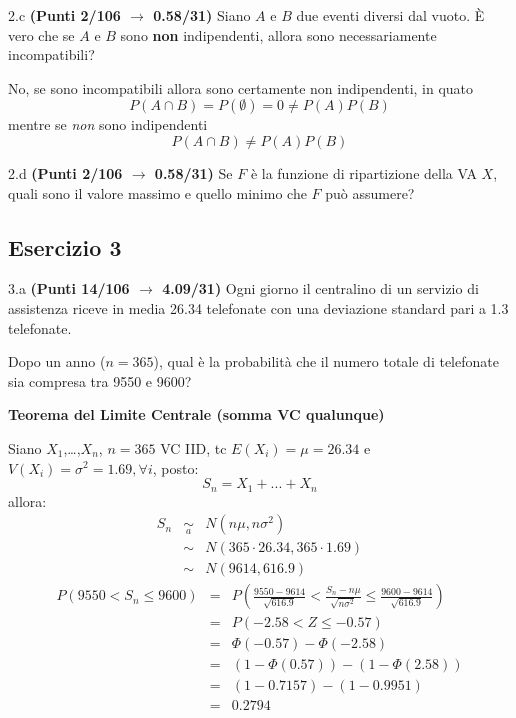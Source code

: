 \documentclass[
  11pt,
]{book}
\theoremstyle{mytheoremstyle}
\theoremstyle{mydefstyle}
\newenvironment{sol}
  {
  \begin{tcolorbox}[enhanced,breakable,arc=0.1mm,boxrule=1pt,colback=white,colframe=iblue,
  title=\bf \fontfamily{lmss}\selectfont \hspace{.5 cm} Soluzione,drop fuzzy shadow]

}{
\end{tcolorbox}
  }
\begin{document}
2.c \textbf{(Punti 2/106 \(\rightarrow\) 0.58/31)} Siano \(A\) e \(B\) due eventi diversi dal vuoto. È vero che se \(A\) e \(B\) sono
\textbf{non} indipendenti, allora sono necessariamente incompatibili?

\begin{sol}
No, se sono incompatibili allora sono certamente non indipendenti, in quato
\[
P(A\cap B)=P(\emptyset)=0\ne P(A)P(B)
\]
mentre se \emph{non} sono indipendenti
\[
P(A\cap B)\ne P(A)P(B)
\]

\end{sol}

2.d \textbf{(Punti 2/106 \(\rightarrow\) 0.58/31)} Se \(F\) è la funzione di ripartizione della VA \(X\),
quali sono il valore massimo e quello minimo che \(F\) può assumere?

\subsection{Esercizio 3}\label{esercizio-3-13}

3.a \textbf{(Punti 14/106 \(\rightarrow\) 4.09/31)} Ogni giorno il centralino di un servizio di assistenza riceve in media 26.34 telefonate con una deviazione standard pari a 1.3 telefonate.

Dopo un anno (\(n=365\)), qual è la probabilità che il numero totale di telefonate sia compresa tra 9550 e 9600?

\begin{sol}
\textbf{Teorema del Limite Centrale (somma VC qualunque)}

Siano \(X_1\),\ldots,\(X_n\), \(n=365\) VC IID, tc \(E(X_i)=\mu=26.34\) e \(V(X_i)=\sigma^2=1.69,\forall i\), posto:
\[
      S_n = X_1 + ... + X_n
      \]
allora:\begin{eqnarray*}
  S_n & \mathop{\sim}\limits_{a}& N(n\mu,n\sigma^2) \\
     &\sim & N(365\cdot26.34,365\cdot1.69) \\
     &\sim & N(9614,616.9) 
  \end{eqnarray*}\begin{eqnarray*}
   P( 9550 < S_n \leq  9600 ) &=& P\left( \frac { 9550  -  9614 }{\sqrt{ 616.9 }} < \frac { S_n  -  n\mu }{ \sqrt{n\sigma^2} } \leq \frac { 9600  -  9614 }{\sqrt{ 616.9 }}\right)  \\
              &=& P\left(  -2.58  < Z \leq  -0.57 \right) \\
              &=& \Phi( -0.57 )-\Phi( -2.58 )\\
              &=&  (1-\Phi( 0.57 ))-(1-\Phi( 2.58 )) \\ &=& (1- 0.7157 )-(1- 0.9951 ) \\ 
              &=&  0.2794 
   \end{eqnarray*}

\end{sol}
\end{document}
